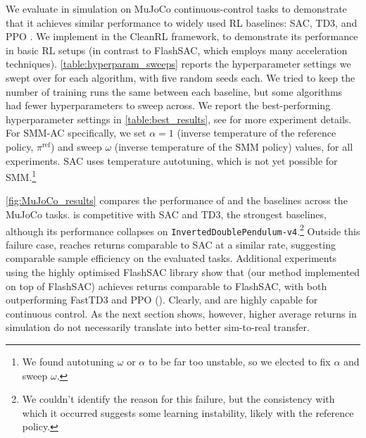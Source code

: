 \documentclass{article} %
\begin{document}
    We evaluate \ourMethod in simulation on MuJoCo continuous-control tasks \citep{todorov2012mujoco} to demonstrate that it achieves similar performance to widely used RL baselines: SAC, TD3, and PPO \citep{haarnoja2018SAC_2, fujimoto2018addressing_TD3, schulman2017proximal_PPO}. We implement \ourMethod in the CleanRL \citep{huang2022cleanrl} framework, to demonstrate its performance in basic RL setups (in contrast to FlashSAC, which employs many acceleration techniques). \autoref{table:hyperparam_sweeps} reports the hyperparameter settings we swept over for each algorithm, with five random seeds each.
    We tried to keep the number of training runs the same between each baseline, but some algorithms had fewer hyperparameters to sweep across.  
    We report the best-performing hyperparameter settings in \autoref{table:best_results}, see  for more experiment details. For SMM-AC specifically, we set $\alpha=1$ (inverse temperature of the reference policy, $\pi^\text{ref}$) and sweep $\omega$ (inverse temperature of the SMM policy) values, for all experiments.
    SAC uses temperature autotuning, which is not yet possible for SMM.\footnote{We found autotuning $\omega$ or $\alpha$ to be far too unstable, so we elected to fix $\alpha$ and sweep $\omega$.}
    
    \autoref{fig:MuJoCo_results} compares the performance of \ourMethod and the baselines across the MuJoCo tasks.
    \ourMethod is competitive with SAC and TD3, the strongest baselines, although its performance collapses on \texttt{InvertedDoublePendulum-v4}.\footnote{We couldn't identify the reason for this failure, but the consistency with which it occurred suggests some learning instability, likely with the reference policy.}
    Outside this failure case, \ourMethod reaches returns comparable to SAC at a similar rate, suggesting comparable sample efficiency on the evaluated tasks.
    Additional experiments using the highly optimised FlashSAC library \citep{kim2026flashsac} show that \flashOurMethod (our method implemented on top of FlashSAC) achieves returns comparable to FlashSAC, with both outperforming FastTD3 \citep{seo2025fasttd3} and PPO (). Clearly, \ourMethod and \flashOurMethod are highly capable for continuous control. As the next section shows, however, higher average returns in simulation do not necessarily translate into better sim-to-real transfer.

\end{document}
